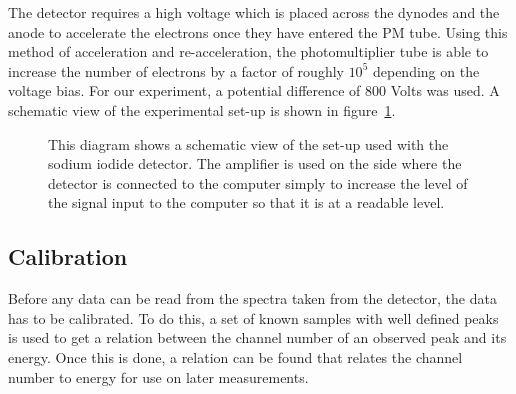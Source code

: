 The detector requires a high voltage which is placed across the dynodes and the anode to accelerate the electrons once they have entered the PM tube. Using this method of acceleration and re-acceleration, the photomultiplier tube is able to increase the number of electrons by a factor of roughly $10^5$ depending on the voltage bias\cite{baratta}. For our experiment, a potential difference of 800 Volts was used. A schematic view of the experimental set-up is shown in figure~\ref{fig:experimentalsetp}.
\begin{figure}[ht]
	\centering
\caption{This diagram shows a schematic view of the set-up used with the sodium iodide detector. The amplifier is used on the side where the detector is connected to the computer simply to increase the level of the signal input to the computer so that it is at a readable level.\label{fig:experimentalsetp}}
\end{figure}


\subsection{Calibration} %
\label{sub:calibration}
Before any data can be read from the spectra taken from the detector, the data has to be calibrated. To do this, a set of known samples with well defined peaks is used to get a relation between the channel number of an observed peak and its energy. Once this is done, a relation can be found that relates the channel number to energy for use on later measurements.

